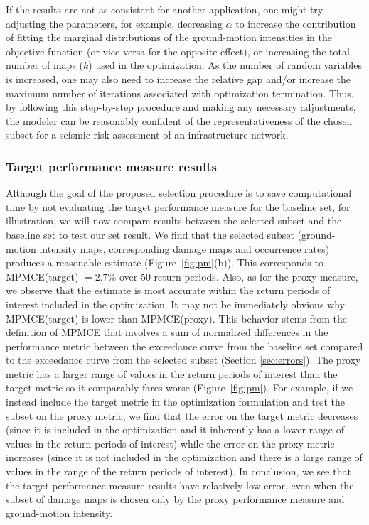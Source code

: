 If the results are not as consistent for another application, one might try adjusting the parameters, for example, decreasing $\alpha$ to increase the contribution of fitting the marginal distributions of the ground-motion intensities in the objective function (or vice versa for the opposite effect), or increasing the total number of maps ($k$) used in the optimization. As the number of random variables is increased, one may also need to increase the relative gap and/or increase the maximum number of iterations associated with optimization termination. Thus, by following this step-by-step procedure and making any necessary adjustments, the modeler can be reasonably confident of the representativeness of the chosen subset for a seismic risk assessment of an infrastructure network.

\subsubsection{Target performance measure results}
Although the goal of the proposed selection procedure is to save computational time by not evaluating the target performance measure for the baseline set, for illustration, we will now compare results between the selected subset and the baseline set to test our set result. We find that the selected subset (ground-motion intensity maps, corresponding damage maps and occurrence rates) produces a reasonable estimate (Figure~\ref{fig:pm}{\color{red}(b)}). This corresponds to MPMCE(target) $= 2.7\%$ over 50 return periods. Also, as for the proxy measure, we observe that the estimate is most accurate within the return periods of interest included in the optimization. It may not be immediately obvious why MPMCE(target) is lower than MPMCE(proxy). This behavior stems from the definition of MPMCE that involves a sum of normalized differences in the performance metric between the exceedance curve from the baseline set compared to the exceedance curve from the selected subset (Section \ref{sec:errors}). The proxy metric has a larger range of values in the return periods of interest than the target metric so it comparably fares worse (Figure~\ref{fig:pm}). For example, if we instead include the target metric in the optimization formulation and test the subset on the proxy metric, we find that the error on the target metric decreases (since it is included in the optimization and it inherently has a lower range of values in the return periods of interest) while the error on the proxy metric increases (since it is not included in the optimization and there is a large range of values in the range of the return periods of interest). In conclusion, we see that the target performance measure results have relatively low error, even when the subset of damage maps is chosen only by the proxy performance measure and ground-motion intensity.
 

